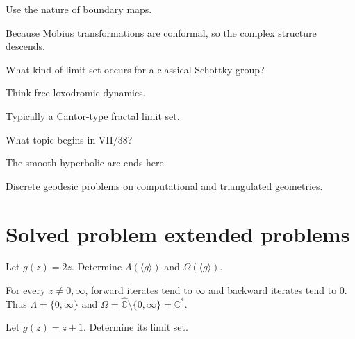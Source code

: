 \begin{hint}
Use the nature of boundary maps.
\end{hint}

\begin{solution}
Because Möbius transformations are conformal, so the complex structure descends.
\end{solution}

\begin{exercise}\label{exr:vii37-23}
What kind of limit set occurs for a classical Schottky group?
\end{exercise}

\begin{hint}
Think free loxodromic dynamics.
\end{hint}

\begin{solution}
Typically a Cantor-type fractal limit set.
\end{solution}

\begin{exercise}\label{exr:vii37-24}
What topic begins in VII/38?
\end{exercise}

\begin{hint}
The smooth hyperbolic arc ends here.
\end{hint}

\begin{solution}
Discrete geodesic problems on computational and triangulated geometries.
\end{solution}

\section{Solved problem extended problems}

\begin{problem}\label{prob:vii37-01}
Let \(g(z)=2z\).  Determine \(\Lambda(\langle g\rangle)\) and \(\Omega(\langle g\rangle)\).
\end{problem}

\begin{solution}
For every \(z\ne0,\infty\), forward iterates tend to \(\infty\) and backward iterates tend to \(0\).  Thus \(\Lambda=\{0,\infty\}\) and \(\Omega=\widehat{\mathbb C}\setminus\{0,\infty\}=\mathbb C^*\).
\end{solution}

\begin{problem}\label{prob:vii37-02}
Let \(g(z)=z+1\).  Determine its limit set.
\end{problem}

